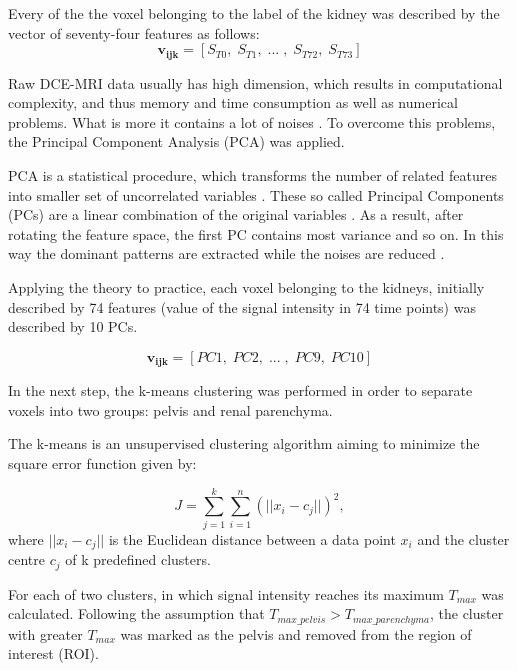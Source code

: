 Every of the the voxel belonging to the label of the kidney was described by the vector of seventy-four features as follows:
\begin{equation}
\label{eq:voxel}
\mathbf{v_{ijk}} = [S_{T0},\; S_{T1},\;...\;,\; S_{T72},\; S_{T73}]  
\end{equation}



Raw DCE-MRI data usually has high dimension, which results in computational complexity, and thus memory and time consumption as well as numerical problems. What is more it contains a lot of noises \cite{KidneySubsegmentation}. To overcome this problems, the Principal Component Analysis (PCA) \cite{wold1987principal} was applied.

PCA is a statistical procedure, which transforms the number of related features into smaller set of uncorrelated variables  \cite{pca}. These so called Principal Components (PCs) are a linear combination of the original variables \cite{dunteman1989principal}. As a result, after rotating the feature space, the first PC contains most variance and so on. In this way the dominant patterns are extracted while the noises are reduced \cite{wold1987principal}.

Applying the theory to practice, each voxel belonging to the kidneys, initially described by 74 features (value of the signal intensity in 74 time points) was described by 10 PCs.

\begin{equation}
\label{eq:voxelpca}
\mathbf{v_{ijk}} = [PC1,\; PC2,\;...\;,\; PC9,\; PC10]  
\end{equation}

In the next step, the k-means clustering \cite{kmeans} was performed in order to separate voxels into two groups: pelvis and renal parenchyma.  

The k-means is an unsupervised clustering algorithm aiming to minimize the square error function given by:

\begin{equation}
	\label{eq:kmeans}
	J = \sum_{j=1}^{k}\sum_{i=1}^{n}(||x_i-c_j||)^2,
\end{equation}
where $||x_i-c_j||$ is  the Euclidean distance between a data point $x_i$ and the cluster centre $c_j$ of k predefined clusters.

For each of two clusters, in which signal intensity reaches its maximum $T_{max}$ was calculated. 
Following the assumption that $T_{max\_pelvis}>T_{max\_parenchyma}$, the cluster with greater $T_{max}$ was marked as the pelvis and removed from the region of interest (ROI).




